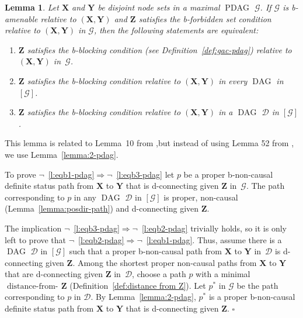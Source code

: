 \documentclass[letterpaper]{article}
\newtheorem{lemma}[theorem]{Lemma}
\theoremstyle{definition}
\newenvironment{proofof}[1][]{\begin{trivlist}
   \item[\hskip \labelsep {\bfseries Proof of #1.}]}{\hfill{}$\square$\end{trivlist}}
\theoremstyle{remark}
\DeclareMathOperator{\PDAG}{PDAG}
\DeclareMathOperator{\DAG}{DAG}
\DeclareMathOperator{\distancefrom}{distance-from-\!}
\newcommand{\bforb}{the b-forbidden set condition}
\newcommand{\bblck}{the b-blocking condition}
\newcommand{\mpdag}{maximal $\PDAG$}
\newcommand{\g}[1][G]{\mathcal{#1}}
\newcommand{\pstar}[1][p]{{#1}^{*}}
\begin{document}
\begin{lemma}
    Let $\mathbf{X}$ and $\mathbf{Y}$ be disjoint node sets in a \mpdag{} $\g$. If $\g$ is b-amenable relative to $(\mathbf{X},\mathbf{Y})$ and $\mathbf{Z}$ satisfies \bforb{} relative to $(\mathbf{X},\mathbf{Y})$ in $\g$, then the following statements are equivalent:
   \begin{enumerate}[label = (\roman*)]
\item\label{l:eqb1-pdag} $\mathbf{Z}$ satisfies \bblck{} (see Definition~\ref{def:gac-pdag}) relative to $(\mathbf{X},\mathbf{Y})$ in~$\g$.
\item\label{l:eqb2-pdag}  $\mathbf{Z}$ satisfies \bblck{} relative to $(\mathbf{X},\mathbf{Y})$ in every $\DAG$ in $[\g]$.
\item\label{l:eqb3-pdag} $\mathbf{Z}$ satisfies \bblck{} relative to $(\mathbf{X},\mathbf{Y})$ in a $\DAG$ $\g[D]$ in $[\g]$.
\end{enumerate}
   \label{lemma:eqb-pdag}
\end{lemma}
\begin{proofof}[Lemma~\ref{lemma:eqb-pdag}]
This lemma is related to Lemma~10 from \cite{perkovic16},but instead of using Lemma 52 from \cite{perkovic16}, we use Lemma~\ref{lemma:2-pdag}.

   To prove $\neg$~\ref{l:eqb1-pdag}$\Rightarrow\neg$~\ref{l:eqb3-pdag} let $p$ be a proper b-non-causal definite status path from $\mathbf{X}$ to $\mathbf{Y}$ that is d-connecting given $\mathbf{Z}$ in~$\g$. The path corresponding to $p$ in any $\DAG$ $\g[D]$ in $[\g]$ is proper, non-causal (Lemma~\ref{lemma:posdir-path}) and d-connecting given $\mathbf{Z}$. 
   
The implication $\neg$~\ref{l:eqb3-pdag}$\Rightarrow\neg$~\ref{l:eqb2-pdag} trivially holds, so it is only left to prove that $\neg$~\ref{l:eqb2-pdag}$\Rightarrow\neg$~\ref{l:eqb1-pdag}.
   Thus, assume there is a $\DAG$ $\g[D]$ in $[\g]$ such that a proper b-non-causal path from $\mathbf{X}$ to $\mathbf{Y}$ in~$\g[D]$ is d-connecting given $\mathbf{Z}$.
  Among the shortest proper non-causal paths from $\mathbf{X}$ to $\mathbf{Y}$ that are d-connecting given $\mathbf{Z}$ in~$\g[D]$, choose a path $p$ with a minimal $\distancefrom{\mathbf{Z}}$ (Definition~\ref{def:distance from Z}). Let $\pstar$ in $\g$ be the path corresponding to $p$ in $\g[D]$. By Lemma~\ref{lemma:2-pdag}, $\pstar$ is a proper b-non-causal definite status path from $\mathbf{X}$ to $\mathbf{Y}$ that is d-connecting given $\mathbf{Z}$. 
\end{proofof}
\end{document}
